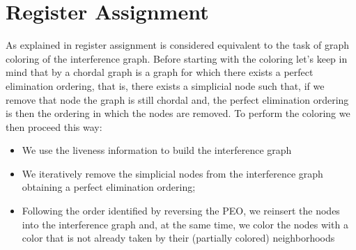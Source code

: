



\section{Register Assignment}
\label{sec:ra}

As explained in  register assignment is considered equivalent to the task of graph coloring of the interference graph.
Before starting with the coloring let's keep in mind that by  a chordal graph is a graph for which there exists a perfect elimination ordering, that is, there exists a simplicial node such that, if we remove that node the graph is still chordal and, the perfect elimination ordering is then the ordering in which the nodes are removed.
To perform the coloring we then proceed this way:
\begin{itemize}
  \item We use the liveness information to build the interference graph
  \item We iteratively remove the simplicial nodes from the interference graph obtaining a perfect elimination ordering;
  \item Following the order identified by reversing the PEO, we reinsert the nodes into the interference graph and, at the same time, we color the nodes with a color that is not already taken by their (partially colored) neighborhoods
\end{itemize}

